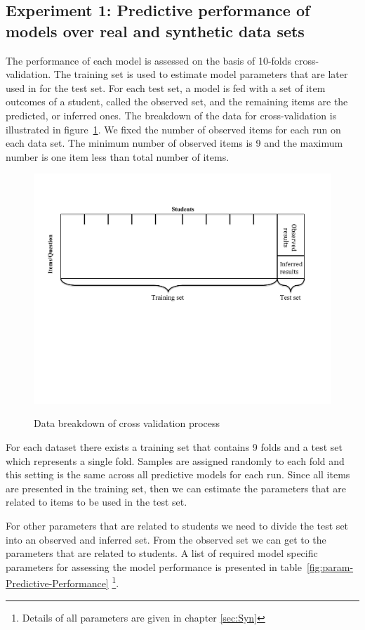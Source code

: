 \begin{enumerate}
\begin{itemize}
\end{itemize}
\end{enumerate}

\subsection{Experiment 1: Predictive performance of models over real and synthetic data sets}

The performance of each model is assessed on the basis of 10-folds cross-validation.  The training set is used to estimate model parameters that are later used in for the test set. For each test set, a model is fed with a set of item outcomes of a student, called the observed set, and the remaining items are the predicted, or inferred ones. The breakdown of the data for cross-validation is illustrated in figure~\ref{figMethod}. We fixed the number of observed items for each run on each data set. The minimum number of observed items is 9 and the maximum number is one item less than total number of items. 

\begin{figure}[h]
\centering
{\includegraphics[trim=1cm 9cm 2.4cm 2.4cm,clip=true,width=.7\textwidth]{images/Methodology.pdf}}
\caption{Data breakdown of cross validation process}
\label{figMethod}
\end{figure}

For each dataset there exists a training set that contains 9 folds and a test set which represents a single fold. Samples are assigned randomly to each fold and this setting is the same across all predictive models for each run. Since all items are presented in the training set, then we can estimate the parameters that are related to items to be used in the test set. 

For other parameters that are related to students we need to divide the test set into an observed and inferred set. From the observed set we can get to the parameters that are related to students. A list of required model specific parameters for assessing the model performance is presented in table~\ref{fig:param-Predictive-Performance} \footnote{Details of all parameters are given in chapter \ref{sec:Syn}}.

